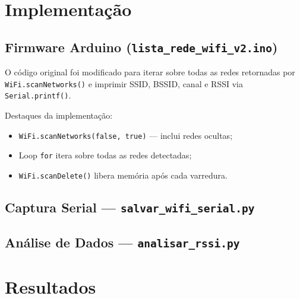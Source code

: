 \documentclass[
  12pt,
  a4paper,
  oneside,
  brazil,
  chapter=TITLE,
  section=TITLE,
]{abntex2}
\begin{document}
\chapter{Implementação}

\section{Firmware Arduino (\texttt{lista\_rede\_wifi\_v2.ino})}

O código original foi modificado para iterar sobre todas as redes retornadas
por \texttt{WiFi.\allowbreak scanNetworks()} e imprimir SSID, BSSID, canal e
RSSI via \texttt{Serial.\allowbreak printf()}.



\noindent Destaques da implementação:
\begin{itemize}
  \item \texttt{WiFi.scanNetworks(false,\,true)} --- inclui redes ocultas;
  \item Loop \texttt{for} itera sobre todas as redes detectadas;
  \item \texttt{WiFi.scanDelete()} libera memória após cada varredura.
\end{itemize}

\section{Captura Serial --- \texttt{salvar\_wifi\_serial.py}}



\section{Análise de Dados --- \texttt{analisar\_rssi.py}}



\chapter{Resultados}
\end{document}
